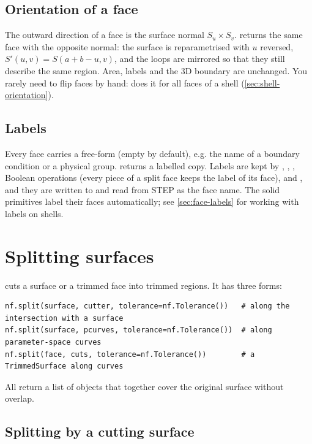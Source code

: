 \subsection{Orientation of a face}\label{sec:trim-flip}

The outward direction of a face is the surface normal $S_u\times S_v$. 
returns the same face with the opposite normal: the surface is reparametrised with $u$
reversed, $S'(u,v) = S(a+b-u, v)$, and the loops are mirrored so that they still describe
the same region. Area, labels and the 3D boundary are unchanged. You rarely need to flip
faces by hand:  does it for all faces of a shell
(\cref{sec:shell-orientation}).

\subsection{Labels}\label{sec:trim-labels}

Every face carries a free-form  (empty by default), e.g. the name of a boundary
condition or a physical group.  returns a labelled copy. Labels are
kept by , , , Boolean operations (every piece of a
split face keeps the label of its face),  and , and
they are written to and read from STEP as the face name. The solid primitives label their
faces automatically; see \cref{sec:face-labels} for working with labels on shells.

\section{Splitting surfaces}\label{sec:split}

 cuts a surface or a trimmed face into trimmed regions. It has three forms:

\begin{lstlisting}
nf.split(surface, cutter, tolerance=nf.Tolerance())   # along the intersection with a surface
nf.split(surface, pcurves, tolerance=nf.Tolerance())  # along parameter-space curves
nf.split(face, cuts, tolerance=nf.Tolerance())        # a TrimmedSurface along curves
\end{lstlisting}

All return a list of  objects that together cover the original surface
without overlap.

\subsection{Splitting by a cutting surface}

